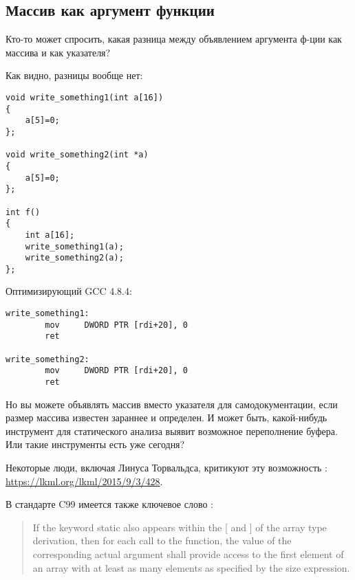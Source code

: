 \subsection{Массив как аргумент функции}

Кто-то может спросить, какая разница между объявлением аргумента ф-ции как массива и как указателя?

Как видно, разницы вообще нет:

\begin{lstlisting}[style=customc]
void write_something1(int a[16])
{
	a[5]=0;
};

void write_something2(int *a)
{
	a[5]=0;
};

int f()
{
	int a[16];
	write_something1(a);
	write_something2(a);
};
\end{lstlisting}

Оптимизирующий GCC 4.8.4:

\begin{lstlisting}[style=customasmx86]
write_something1:
        mov     DWORD PTR [rdi+20], 0
        ret

write_something2:
        mov     DWORD PTR [rdi+20], 0
        ret
\end{lstlisting}

Но вы можете объявлять массив вместо указателя для самодокументации, если размер массива известен зараннее и определен.
И может быть, какой-нибудь инструмент для статического анализа выявит возможное переполнение буфера.
Или такие инструменты есть уже сегодня?

Некоторые люди, включая Линуса Торвальдса, критикуют эту возможность \CCpp{}: \url{https://lkml.org/lkml/2015/9/3/428}.

В стандарте C99 имеется также ключевое слово  :

\begin{framed}
\begin{quotation}
If the keyword static also appears  within the [ and ] of the array type derivation, then for each call to the function, the value of the corresponding actual argument shall provide access to the first element of an array with at least as many elements as specified by the size expression.
\end{quotation}
\end{framed}

